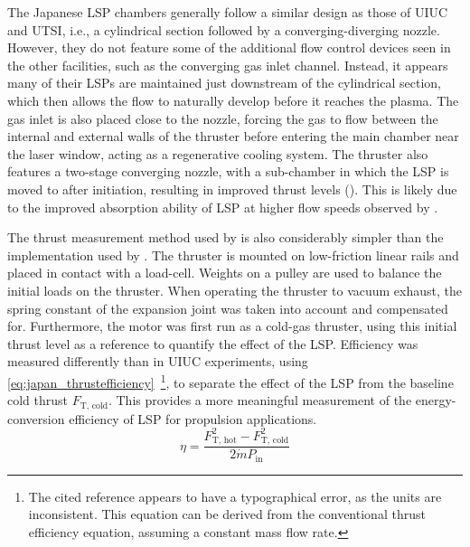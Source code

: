             The Japanese LSP chambers generally follow a similar design as those of UIUC and UTSI, i.e., a cylindrical section followed by a converging-diverging nozzle. However, they do not feature some of the additional flow control devices seen in the other facilities, such as the converging gas inlet channel. Instead, it appears many of their LSPs are maintained just downstream of the cylindrical section, which then allows the flow to naturally develop before it reaches the plasma. The gas inlet is also placed close to the nozzle, forcing the gas to flow between the internal and external walls of the thruster before entering the main chamber near the laser window, acting as a regenerative cooling system. The thruster also features a two-stage converging nozzle, with a sub-chamber in which the LSP is moved to after initiation, resulting in improved thrust levels (\textcite{toyodaThrustPerformanceCW2002}). This is likely due to the improved absorption ability of LSP at higher flow speeds observed by \textcite{welleEnergyConversionEfficiency1986}.

            The thrust measurement method used by \textcite{toyodaThrustPerformanceCW2002} is also considerably simpler than the implementation used by \textcite{blackLaserPropulsion10kW1995}. The thruster is mounted on low-friction linear rails and placed in contact with a load-cell. Weights on a pulley are used to balance the initial loads on the thruster. When operating the thruster to vacuum exhaust, the spring constant of the expansion joint was taken into account and compensated for. Furthermore, the motor was first run as a cold-gas thruster, using this initial thrust level as a reference to quantify the effect of the LSP. Efficiency was measured differently than in UIUC experiments, using \autoref{eq:japan_thrustefficiency}~\cite{toyodaThrustPerformanceCW2002}\footnote{The cited reference appears to have a typographical error, as the units are inconsistent. This equation can be derived from the conventional thrust efficiency equation, assuming a constant mass flow rate.}, to separate the effect of the LSP from the baseline cold thrust $F_\text{T, cold}$. This provides a more meaningful measurement of the energy-conversion efficiency of LSP for propulsion applications.
            \begin{equation} \label{eq:japan_thrustefficiency}
                \eta = \frac{F_\text{T, hot}^2-F_\text{T, cold}^2}{2\dot{m}P_\mathrm{in}}
            \end{equation}

